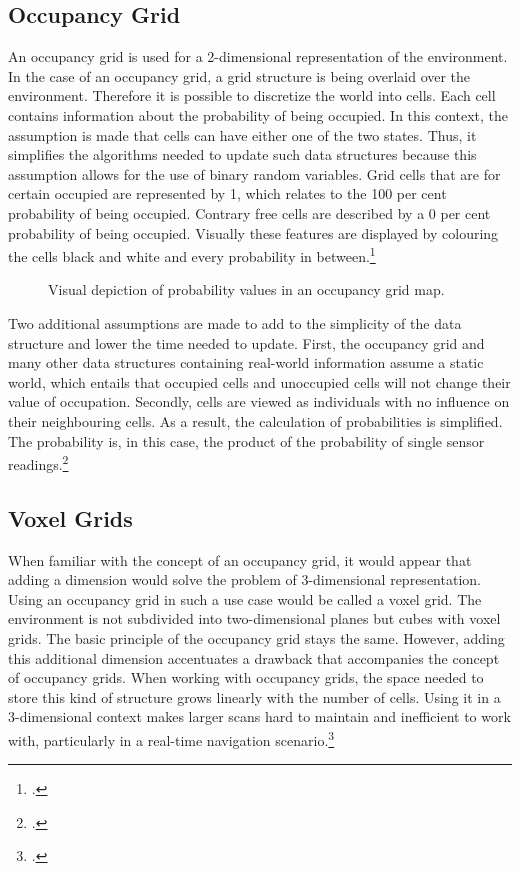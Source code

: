 \subsection{Occupancy Grid}
An occupancy grid is used for a 2-dimensional representation of the environment. In the case of an occupancy grid, a grid structure is being overlaid over the environment. Therefore it is possible to discretize the world into cells. Each cell contains information about the probability of being occupied. In this context, the assumption is made that cells can have either one of the two states. Thus, it simplifies the algorithms needed to update such data structures because this assumption allows for the use of binary random variables. Grid cells that are for certain occupied are represented by 1, which relates to the 100 per cent probability of being occupied. Contrary free cells are described by a 0 per cent probability of being occupied. Visually these features are displayed by colouring the cells black and white and every probability in between.\footcite{uni-freiburgOccupancyGridMaps2020}

\begin{figure}[h]
	\centering
	
	\caption{Visual depiction of probability values in an occupancy grid map.}
	\label{fig:abstract_environments_occupancyCells}
\end{figure}

Two additional assumptions are made to add to the simplicity of the data structure and lower the time needed to update. First, the occupancy grid and many other data structures containing real-world information assume a static world, which entails that occupied cells and unoccupied cells will not change their value of occupation. Secondly, cells are viewed as individuals with no influence on their neighbouring cells. As a result, the calculation of probabilities is simplified. The probability is, in this case, the product of the probability of single sensor readings.\footcite{uni-freiburgOccupancyGridMaps2020}

\subsection{Voxel Grids}

When familiar with the concept of an occupancy grid, it would appear that adding a dimension would solve the problem of 3-dimensional representation.
Using an occupancy grid in such a use case would be called a voxel grid. The environment is not subdivided into two-dimensional planes but cubes with voxel grids. The basic principle of the occupancy grid stays the same. However, adding this additional dimension accentuates a drawback that accompanies the concept of occupancy grids. When working with occupancy grids, the space needed to store this kind of structure grows linearly with the number of cells. Using it in a 3-dimensional context makes larger scans hard to maintain and inefficient to work with, particularly in a real-time navigation scenario.\footcite{uni-freiburgOccupancyGridMaps2020}

